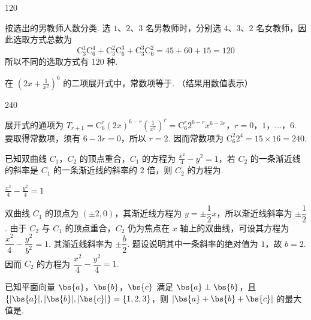 \begin{answer}
120
\end{answer}

\begin{solution}
按选出的男教师人数分类. 选 \(1\)、\(2\)、\(3\) 名男教师时，分别选 \(4\)、\(3\)、\(2\) 名女教师，因此选取方式总数为
\[
\mathrm C_3^1\mathrm C_6^4+\mathrm C_3^2\mathrm C_6^3+\mathrm C_3^3\mathrm C_6^2=45+60+15=120
\]
所以不同的选取方式有 \(120\) 种.
\end{solution}

\begin{problem}
在 \(\left(2x + \frac{1}{x^2}\right)^6\) 的二项展开式中，常数项等于\fillinblank{}. （结果用数值表示）
\end{problem}

\begin{answer}
240
\end{answer}

\begin{solution}
展开式的通项为
\(T_{r+1}=\mathrm C_6^r(2x)^{6-r}\left(\frac{1}{x^2}\right)^r=\mathrm C_6^r2^{6-r}x^{6-3r}\)，\(r=0\)，\(1\)，\(\dots\)，\(6\).
要取得常数项，须有 \(6-3r=0\)，所以 \(r=2\). 因而常数项为 \(\mathrm C_6^2 2^4=15\times16=240\).
\end{solution}

\begin{problem}
已知双曲线 \(C_1\)，\(C_2\) 的顶点重合，\(C_1\) 的方程为 \(\frac{x^2}{4} - y^2 = 1\)，若 \(C_2\) 的一条渐近线的斜率是 \(C_1\) 的一条渐近线的斜率的 2 倍，则 \(C_2\) 的方程为\fillinblank{}.
\end{problem}

\begin{answer}
\(\frac{x^2}{4}-\frac{y^2}{4}=1\)
\end{answer}

\begin{solution}
双曲线 \(C_1\) 的顶点为 \((\pm2,0)\)，其渐近线方程为 \(y=\pm\dfrac12x\)，所以渐近线斜率为 \(\pm\dfrac12\). 由于 \(C_2\) 与 \(C_1\) 的顶点重合，\(C_2\) 仍为焦点在 \(x\) 轴上的双曲线，可设其方程为 \(\dfrac{x^2}{4}-\dfrac{y^2}{b^2}=1\). 其渐近线斜率为 \(\pm\dfrac b2\). 题设说明其中一条斜率的绝对值为 \(1\)，故 \(b=2\). 因而 \(C_2\) 的方程为 \(\dfrac{x^2}{4}-\dfrac{y^2}{4}=1\).
\end{solution}

\begin{problem}
已知平面向量 \(\bs{a}\)，\(\bs{b}\)，\(\bs{c}\) 满足 \(\bs{a} \perp \bs{b}\)，且 \(\{|\bs{a}|, |\bs{b}|, |\bs{c}|\} = \{1, 2, 3\}\)，则 \(|\bs{a} + \bs{b} + \bs{c}|\) 的最大值是\fillinblank{}.
\end{problem}

